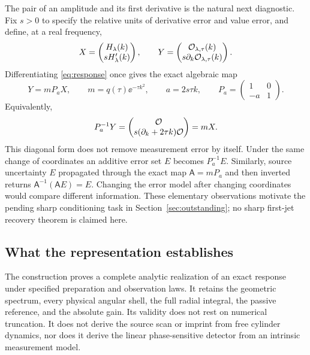 The pair of an amplitude and its first derivative is the natural next
diagnostic. Fix $s>0$ to specify the relative units of derivative error
and value error, and define, at a real frequency,
\begin{equation}
 X=\begin{pmatrix}H_\lambda(k)\\sH_\lambda'(k)\end{pmatrix},
 \qquad
 Y=\begin{pmatrix}\mathcal O_{\lambda,\tau}(k)\\
                         s\partial_k\mathcal O_{\lambda,\tau}(k)\end{pmatrix}.
\end{equation}
Differentiating \eqref{eq:response} once gives the exact algebraic map
\begin{equation}
 Y=mP_aX,\qquad m=q(\tau)\ee^{-\tau k^2},\qquad
 a=2s\tau k,\qquad
 P_a=\begin{pmatrix}1&0\\-a&1\end{pmatrix}.
 \label{eq:first-jet}
\end{equation}
Equivalently,
\begin{equation}
 P_a^{-1}Y=
 \begin{pmatrix}\mathcal O\\s(\partial_k+2\tau k)\mathcal O\end{pmatrix}
 =mX.
 \label{eq:covariant-pair}
\end{equation}
This diagonal form does not remove measurement error by itself. Under
the same change of coordinates an additive error set $E$ becomes
$P_a^{-1}E$. Similarly, source uncertainty $E$ propagated through the
exact map $\mathsf A=mP_a$ and then inverted returns
$\mathsf A^{-1}(\mathsf A E)=E$.
Changing the error model after changing coordinates would compare
different information. These elementary observations motivate the
pending sharp conditioning task in Section~\ref{sec:outstanding}; no
sharp first-jet recovery theorem is claimed here.

\subsection{What the representation establishes}

The construction proves a complete analytic realization of an exact
response under specified preparation and observation laws. It retains
the geometric spectrum, every physical angular shell, the full radial
integral, the passive reference, and the absolute gain. Its validity
does not rest on numerical truncation. It does not derive the source
scan or imprint from free cylinder dynamics, nor does it derive the
linear phase-sensitive detector from an intrinsic measurement model.

